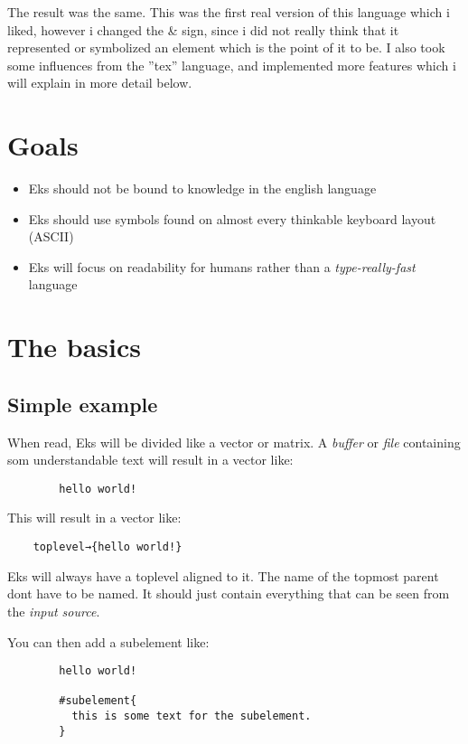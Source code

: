 \documentclass{book}
\begin{document}
	The result was the same. This was the first real version of this language which i liked, however i changed the \& sign, since i did not really think that it represented or symbolized an element which is the point of it to be.
	I also took some influences from the ''tex'' language, and implemented more features which i will explain in more detail below.
	
	\chapter{Goals}
	
	\begin{itemize}
		\item Eks should not be bound to knowledge in the english language
		\item Eks should use symbols found on almost every thinkable keyboard layout (ASCII)
		\item Eks will focus on readability for humans rather than a \emph{type-really-fast} language
	\end{itemize}
	
	\chapter{The basics}
	
	\section{Simple example}
	
	When read, Eks will be divided like a vector or matrix. A \emph{buffer} or \emph{file} containing som understandable text will result in a vector like:
	
	\begin{verbatim}
		hello world!
	\end{verbatim}
	
	This will result in a vector like:
	
	\begin{verbatim}
	toplevel→{hello world!}
	\end{verbatim}
	
	Eks will always have a toplevel aligned to it. The name of the topmost parent dont have to be named. It should just contain everything that can be seen from the \emph{input source}.
	
	You can then add a subelement like:
	
	\begin{verbatim}
		hello world!
		
		#subelement{
		  this is some text for the subelement.
		}
	\end{verbatim}
	
\end{document}
